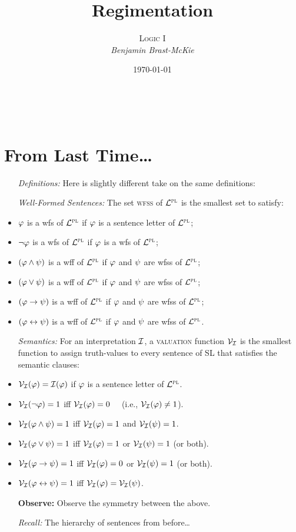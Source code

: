 \documentclass[a4paper, 11pt]{article} %
\title{\textbf{Regimentation}} %
\author{\textsc{Logic I}\\ \em Benjamin Brast-McKie} %
\date{\today} %
\makeatletter
\renewcommand{\maketitle}{
\begin{flushright}
{\LARGE\@title}

\vspace{10pt}

{\@author}
\\ \@date
\end{flushright}

\vspace{0pt}

}
\makeatother
\begin{document}
\maketitle %

\thispagestyle{empty}


\section*{From Last Time\ldots}

\begin{itemize}[leftmargin=1.5in,labelsep=.15in] %
  \item[\it Definitions:] Here is slightly different take on the same definitions:
  \item[\it Well-Formed Sentences:] The set \textsc{wfss} of $\mathcal{L}^{\textsc{pl}}$ is the smallest set to satisfy:
    \item $\varphi$ is a wfs of $\mathcal{L}^{\textsc{pl}}$ if $\varphi$ is a sentence letter of $\mathcal{L}^{\textsc{pl}}$;
    \item $\neg\varphi$ is a wfs of $\mathcal{L}^{\textsc{pl}}$ if $\varphi$ is a wfs of $\mathcal{L}^{\textsc{pl}}$;
    \item $(\varphi\wedge\psi)$ is a wff of $\mathcal{L}^{\textsc{pl}}$ if $\varphi$ and $\psi$ are wfss of $\mathcal{L}^{\textsc{pl}}$;
    \item $(\varphi\vee\psi)$ is a wff of $\mathcal{L}^{\textsc{pl}}$ if $\varphi$ and $\psi$ are wfss of $\mathcal{L}^{\textsc{pl}}$;
    \item $(\varphi\rightarrow\psi)$ is a wff of $\mathcal{L}^{\textsc{pl}}$ if $\varphi$ and $\psi$ are wfss of $\mathcal{L}^{\textsc{pl}}$; 
    \item $(\varphi\leftrightarrow\psi)$ is a wff of $\mathcal{L}^{\textsc{pl}}$ if $\varphi$ and $\psi$ are wfss of $\mathcal{L}^{\textsc{pl}}$.
  \item[\it Semantics:] For an interpretation $\mathcal{I}$, a \textsc{valuation} function $\mathcal{V}_{\mathcal{I}}$ is the smallest function to assign truth-values to every sentence of SL that satisfies the semantic clauses:
    \item $\mathcal{V}_{\mathcal{I}}(\varphi)=\mathcal{I}(\varphi)$ if $\varphi$ is a sentence letter of $\mathcal{L}^{\textsc{pl}}$.
    \item $\mathcal{V}_{\mathcal{I}}(\neg\varphi)=1$ iff $\mathcal{V}_{\mathcal{I}}(\varphi)=0$~~ (i.e., $\mathcal{V}_{\mathcal{I}}(\varphi)\neq 1$).
    \item $\mathcal{V}_{\mathcal{I}}(\varphi \wedge \psi)=1$ iff $\mathcal{V}_{\mathcal{I}}(\varphi)=1$ and $\mathcal{V}_{\mathcal{I}}(\psi)=1$.
    \item $\mathcal{V}_{\mathcal{I}}(\varphi \vee \psi)=1$ iff $\mathcal{V}_{\mathcal{I}}(\varphi)=1$ or $\mathcal{V}_{\mathcal{I}}(\psi)=1$ (or both).
    \item $\mathcal{V}_{\mathcal{I}}(\varphi \rightarrow \psi)=1$ iff $\mathcal{V}_{\mathcal{I}}(\varphi)=0$ or $\mathcal{V}_{\mathcal{I}}(\psi)=1$ (or both).
    \item $\mathcal{V}_{\mathcal{I}}(\varphi \leftrightarrow \psi)=1$ iff $\mathcal{V}_{\mathcal{I}}(\varphi)=\mathcal{V}_{\mathcal{I}}(\psi)$.
  \item[\bf Observe:] Observe the symmetry between the above.
  \item[\it Recall:] The hierarchy of sentences from before\ldots
\end{itemize}
\end{document}
